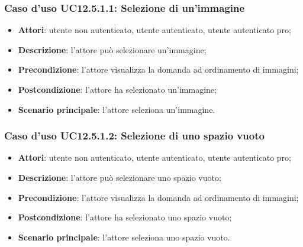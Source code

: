 \subsubsection{Caso d'uso UC12.5.1.1: Selezione di un'immagine}
\begin{itemize}
\item \textbf{Attori}: utente non autenticato, utente autenticato, utente autenticato pro;
\item \textbf{Descrizione}: l'attore può selezionare un'immagine;
\item \textbf{Precondizione}: l'attore visualizza la domanda ad ordinamento di immagini;
\item \textbf{Postcondizione}: l'attore ha selezionato un'immagine;
\item \textbf{Scenario principale}: l'attore seleziona un'immagine.
\end{itemize}

\subsubsection{Caso d'uso UC12.5.1.2: Selezione di uno spazio vuoto}
\begin{itemize}
\item \textbf{Attori}: utente non autenticato, utente autenticato, utente autenticato pro;
\item \textbf{Descrizione}: l'attore può selezionare uno spazio vuoto;
\item \textbf{Precondizione}: l'attore visualizza la domanda ad ordinamento di immagini;
\item \textbf{Postcondizione}: l'attore ha selezionato uno spazio vuoto;
\item \textbf{Scenario principale}: l'attore seleziona uno spazio vuoto.
\end{itemize}

